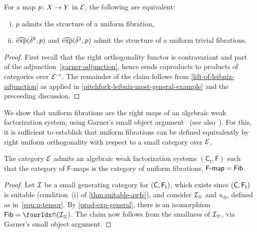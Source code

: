 \documentclass[reqno,10pt,a4paper,oneside,draft]{amsart}
\begin{document}
{{\begin{proposition} \label{prod-exp-general}
For a map $p \co X \to Y$ in $\catE$, the following are equivalent:
\begin{enumerate}[(i)]
\item $p$ admits the structure of a uniform fibration,
\item $\hatexp(\bar{\delta}^0, p)$ and $\hatexp(\bar{\delta}^1, p)$ admit the structure of a uniform trivial fibrations.
\end{enumerate}
\end{proposition}

\begin{proof}
First recall that the right orthogonality functor is contravariant and part of the adjunction~\eqref{garner-adjunction}, hence sends coproducts to products of categories over $\catE^\to$.
The remainder of the claim follows from \cref{lift-of-leibniz-adjunction} as applied in \cref{pitchfork-leibniz-most-general-example} and the preceeding discussion.
\end{proof}



We show that uniform fibrations are the right maps of an algebraic weak factorization system, using Garner's small object argument~\cite{garner:small-object-argument} (see also~\cite[Proposition~16]{bourke-garner-I}). For this, it is sufficient to establish
that uniform fibrations can be defined equivalently by right uniform orthogonality with respect to a small category over $\catE$.




\newcommand{\TC}{\mathsf{C_t}}
\newcommand{\FF}{\mathsf{F}}



\begin{theorem} \label{thm:sset-cset-nwfs} The category $\cal{E}$ admits an algebraic weak factorization systems $(\TC, \FF)$ such that  the category of $\mathsf{F}$-maps is the category of uniform fibrations, \ie $\palg{\mathsf{F}} = \Fib$.
\end{theorem}

\begin{proof} Let $\cal{I}$ be a small generating category for $(\CC, \TF)$, which exists since 
$(\CC, \TF)$ is suitable (condition~(i) of \cref{thm:suitable-awfs}), and consider $\cal{I}_\otimes$ and $u_\otimes$, defined as in~\eqref{equ:u-tensor}.
By \cref{prod-exp-general}, there is an isomorphism $\Fib  = \liftr{(\cal{I}_\otimes)}$. The claim now follows 
from the smallness of  $\cal{I}_\otimes$, via Garner's small object argument.
\end{proof}


}}
\end{document}
